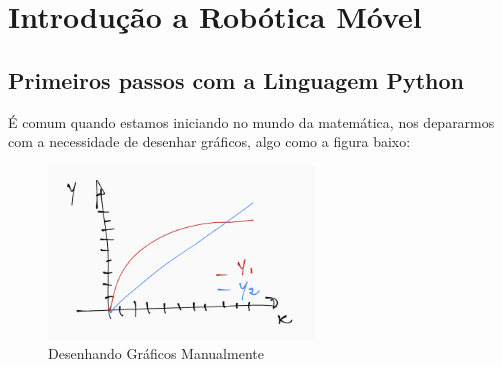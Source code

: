 
\chapter{Introdução a Robótica Móvel}




\section{Primeiros passos com a Linguagem Python}\label{python}

É comum quando estamos iniciando no mundo da matemática, nos depararmos com a necessidade de desenhar gráficos, algo como a figura baixo:

\begin{figure}
    \includegraphics[width=200pt]{chapters/chapter0/figures/manual_graph.png}
    \caption[Desenhando Gráficos Manualmente]{Desenhando Gráficos Manualmente}
\end{figure}

